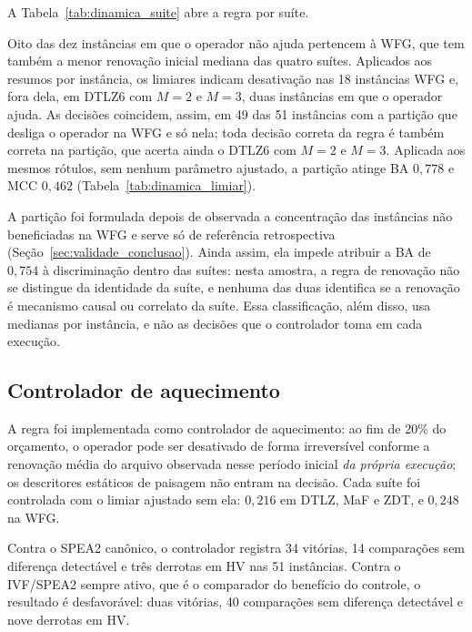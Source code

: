 A Tabela~\ref{tab:dinamica_suite} abre a regra por suíte.



Oito das dez instâncias em que o operador não ajuda pertencem à WFG, que tem também a menor renovação inicial mediana das quatro suítes. Aplicados aos resumos por instância, os limiares indicam desativação nas 18 instâncias WFG e, fora dela, em DTLZ6 com $M=2$ e $M=3$, duas instâncias em que o operador ajuda. As decisões coincidem, assim, em 49 das 51 instâncias com a partição que desliga o operador na WFG e só nela; toda decisão correta da regra é também correta na partição, que acerta ainda o DTLZ6 com $M=2$ e $M=3$. Aplicada aos mesmos rótulos, sem nenhum parâmetro ajustado, a partição atinge BA $0{,}778$ e MCC $0{,}462$ (Tabela~\ref{tab:dinamica_limiar}).

A partição foi formulada depois de observada a concentração das instâncias não beneficiadas na WFG e serve só de referência retrospectiva (Seção~\ref{sec:validade_conclusao}). Ainda assim, ela impede atribuir a BA de $0{,}754$ à discriminação dentro das suítes: nesta amostra, a regra de renovação não se distingue da identidade da suíte, e nenhuma das duas identifica se a renovação é mecanismo causal ou correlato da suíte. Essa classificação, além disso, usa medianas por instância, e não as decisões que o controlador toma em cada execução.

\subsection{Controlador de aquecimento}

A regra foi implementada como controlador de aquecimento: ao fim de 20\% do orçamento, o operador pode ser desativado de forma irreversível conforme a renovação média do arquivo observada nesse período inicial \emph{da própria execução}; os descritores estáticos de paisagem não entram na decisão. Cada suíte foi controlada com o limiar ajustado sem ela: $0{,}216$ em DTLZ, MaF e ZDT, e $0{,}248$ na WFG.



Contra o SPEA2 canônico, o controlador registra 34 vitórias, 14 comparações sem diferença detectável e três derrotas em HV nas 51 instâncias. Contra o IVF/SPEA2 sempre ativo, que é o comparador do benefício do controle, o resultado é desfavorável: duas vitórias, 40 comparações sem diferença detectável e nove derrotas em HV.

